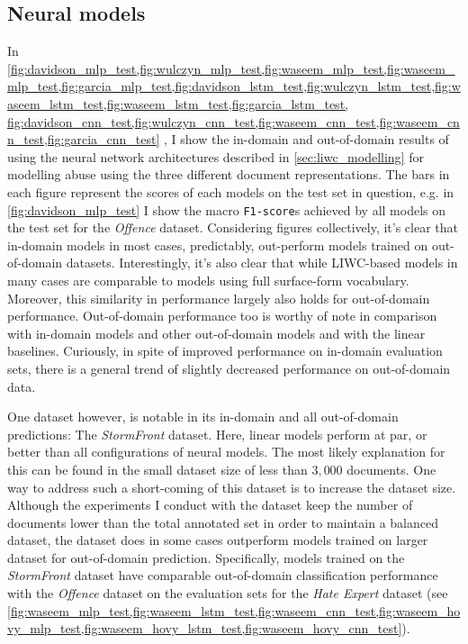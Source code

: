 \subsection{Neural models}

In \cref{fig:davidson_mlp_test,fig:wulczyn_mlp_test,fig:waseem_mlp_test,fig:waseem_mlp_test,fig:garcia_mlp_test,fig:davidson_lstm_test,fig:wulczyn_lstm_test,fig:waseem_lstm_test,fig:waseem_lstm_test,fig:garcia_lstm_test, fig:davidson_cnn_test,fig:wulczyn_cnn_test,fig:waseem_cnn_test,fig:waseem_cnn_test,fig:garcia_cnn_test}
, I show the in-domain and out-of-domain results of using the neural network architectures described in \cref{sec:liwc_modelling} for modelling abuse using the three different document representations. The bars in each figure represent the scores of each models on the test set in question, e.g. in \cref{fig:davidson_mlp_test} I show the macro \texttt{F1-score}s achieved by all models on the test set for the \textit{Offence} dataset.
Considering figures collectively, it's clear that in-domain models in most cases, predictably, out-perform models trained on out-of-domain datasets. Interestingly, it's also clear that while LIWC-based models in many cases are comparable to models using full surface-form vocabulary. Moreover, this similarity in performance largely also holds for out-of-domain performance.
Out-of-domain performance too is worthy of note in comparison with in-domain models and other out-of-domain models and with the linear baselines. Curiously, in spite of improved performance on in-domain evaluation sets, there is a general trend of slightly decreased performance on out-of-domain data.

One dataset however, is notable in its in-domain and all out-of-domain predictions: The \textit{StormFront} dataset. Here, linear models perform at par, or better than all configurations of neural models. The most likely explanation for this can be found in the small dataset size of less than $3,000$ documents. One way to address such a short-coming of this dataset is to increase the dataset size. Although the experiments I conduct with the dataset keep the number of documents lower than the total annotated set in order to maintain a balanced dataset, the dataset does in some cases outperform models trained on larger dataset for out-of-domain prediction. Specifically, models trained on the \textit{StormFront} dataset have comparable out-of-domain classification performance with the \textit{Offence} dataset on the evaluation sets for the \textit{Hate Expert} dataset (see \cref{fig:waseem_mlp_test,fig:waseem_lstm_test,fig:waseem_cnn_test,fig:waseem_hovy_mlp_test,fig:waseem_hovy_lstm_test,fig:waseem_hovy_cnn_test}).

